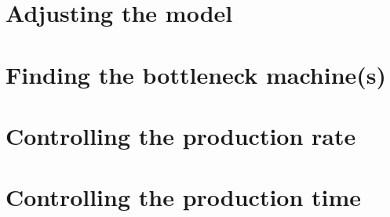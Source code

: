 \section{Adjusting the model}

\section{Finding the bottleneck machine(s)}

\section{Controlling the production rate}

\section{Controlling the production time}
